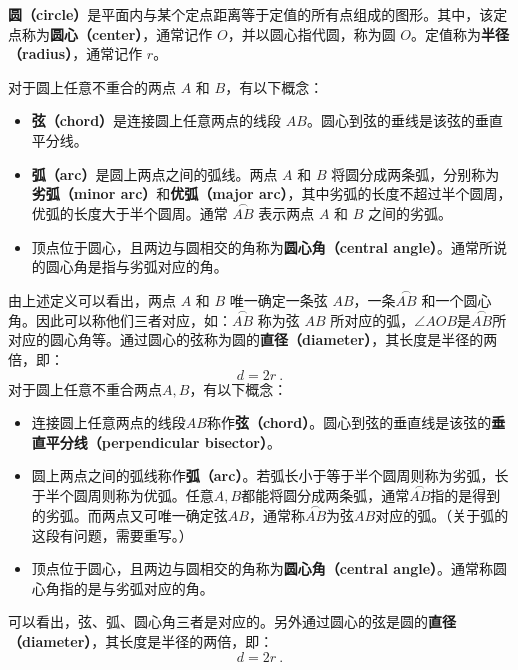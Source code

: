 \textbf{圆（circle）}是平面内与某个定点距离等于定值的所有点组成的图形。其中，该定点称为\textbf{圆心（center）}，通常记作 $O$，并以圆心指代圆，称为圆 $O$。定值称为\textbf{半径（radius）}，通常记作 $r$。

对于圆上任意不重合的两点 $A$ 和 $B$，有以下概念：
\begin{itemize}
\item \textbf{弦（chord）}是连接圆上任意两点的线段 $AB$。圆心到弦的垂线是该弦的垂直平分线。

\item \textbf{弧（arc）}是圆上两点之间的弧线。两点 $A$ 和 $B$ 将圆分成两条弧，分别称为\textbf{劣弧（minor arc）}和\textbf{优弧（major arc）}，其中劣弧的长度不超过半个圆周，优弧的长度大于半个圆周。通常 $\overset{\frown}{AB}$ 表示两点 $A$ 和 $B$ 之间的劣弧。

\item 顶点位于圆心，且两边与圆相交的角称为\textbf{圆心角（central angle）}。通常所说的圆心角是指与劣弧对应的角。
\end{itemize}

由上述定义可以看出，两点 $A$ 和 $B$ 唯一确定一条弦 $AB$，一条$\overset{\frown}{AB}$ 和一个圆心角。因此可以称他们三者对应，如：$\overset{\frown}{AB}$ 称为弦 $AB$ 所对应的弧，$\angle AOB$是$\overset{\frown}{AB}$所对应的圆心角等。通过圆心的弦称为圆的\textbf{直径（diameter）}，其长度是半径的两倍，即：
\begin{equation}
d = 2r~.
\end{equation}
对于圆上任意不重合两点$A,B$，有以下概念：
\begin{itemize}
\item 连接圆上任意两点的线段$AB$称作\textbf{弦（chord）}。圆心到弦的垂直线是该弦的\textbf{垂直平分线（perpendicular bisector）}。
\item 圆上两点之间的弧线称作\textbf{弧（arc）}。若弧长小于等于半个圆周则称为劣弧，长于半个圆周则称为优弧。任意$A,B$都能将圆分成两条弧，通常$\overset{\frown} {AB}$指的是得到的劣弧。而两点又可唯一确定弦$AB$，通常称$\overset{\frown} {AB}$为弦$AB$对应的弧。（关于弧的这段有问题，需要重写。）
\item 顶点位于圆心，且两边与圆相交的角称为\textbf{圆心角（central angle）}。通常称圆心角指的是与劣弧对应的角。
\end{itemize}
可以看出，弦、弧、圆心角三者是对应的。另外通过圆心的弦是圆的\textbf{直径（diameter）}，其长度是半径的两倍，即：
\begin{equation}
d = 2r~.
\end{equation}

